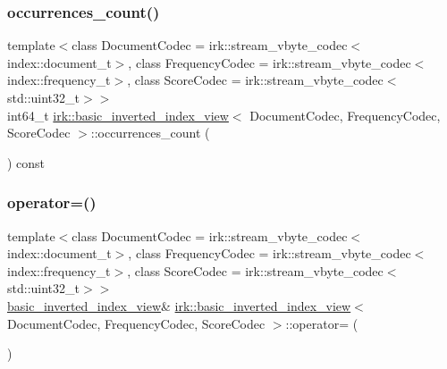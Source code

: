 \mbox{\label{classirk_1_1basic__inverted__index__view_a7a5dbe03c2b4aac509e3567a97ba2aa4}} 
\subsubsection{\texorpdfstring{occurrences\+\_\+count()}{occurrences\_count()}}
{\footnotesize\ttfamily template$<$class Document\+Codec  = irk\+::stream\+\_\+vbyte\+\_\+codec$<$index\+::document\+\_\+t$>$, class Frequency\+Codec  = irk\+::stream\+\_\+vbyte\+\_\+codec$<$index\+::frequency\+\_\+t$>$, class Score\+Codec  = irk\+::stream\+\_\+vbyte\+\_\+codec$<$std\+::uint32\+\_\+t$>$$>$ \\
int64\+\_\+t \mbox{\hyperlink{classirk_1_1basic__inverted__index__view}{irk\+::basic\+\_\+inverted\+\_\+index\+\_\+view}}$<$ Document\+Codec, Frequency\+Codec, Score\+Codec $>$\+::occurrences\+\_\+count (\begin{DoxyParamCaption}{ }\end{DoxyParamCaption}) const\hspace{0.3cm}{\ttfamily [inline]}}

\mbox{\label{classirk_1_1basic__inverted__index__view_a61b08aa3e377ac442f95488ef8514ba5}} 
\subsubsection{\texorpdfstring{operator=()}{operator=()}\hspace{0.1cm}{\footnotesize\ttfamily [1/2]}}
{\footnotesize\ttfamily template$<$class Document\+Codec  = irk\+::stream\+\_\+vbyte\+\_\+codec$<$index\+::document\+\_\+t$>$, class Frequency\+Codec  = irk\+::stream\+\_\+vbyte\+\_\+codec$<$index\+::frequency\+\_\+t$>$, class Score\+Codec  = irk\+::stream\+\_\+vbyte\+\_\+codec$<$std\+::uint32\+\_\+t$>$$>$ \\
\mbox{\hyperlink{classirk_1_1basic__inverted__index__view}{basic\+\_\+inverted\+\_\+index\+\_\+view}}\& \mbox{\hyperlink{classirk_1_1basic__inverted__index__view}{irk\+::basic\+\_\+inverted\+\_\+index\+\_\+view}}$<$ Document\+Codec, Frequency\+Codec, Score\+Codec $>$\+::operator= (\begin{DoxyParamCaption}\item[{const \mbox{\hyperlink{classirk_1_1basic__inverted__index__view}{basic\+\_\+inverted\+\_\+index\+\_\+view}}$<$ Document\+Codec, Frequency\+Codec, Score\+Codec $>$ \&}]{ }\end{DoxyParamCaption})\hspace{0.3cm}{\ttfamily [default]}}

